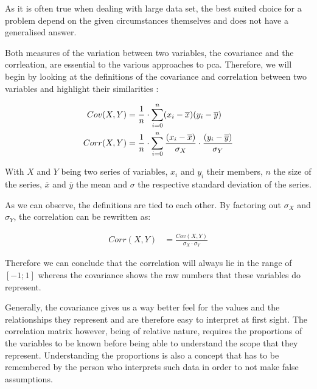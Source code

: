 As it is often true when dealing with large data set, the best suited choice for a problem depend on the given circumstances themselves and does not have a generalised answer. 

Both measures of the variation between two variables, the covariance and the corrleation, are essential to the various approaches to \gls{pca}.
Therefore, we will begin by looking at the definitions of the covariance and correlation between two variables and highlight their similarities \cite{downey2011think}:


\vspace{-28mm}
{
\begin{align}
	\label{formula:covariance}
	Cov(X,Y) &= \frac{1}{n} \cdot \displaystyle\sum_{i=0}^{n} (x_i - \overline{x})(y_i - \overline{y})\bigskip
	\\
	\label{formula:correlation}
	Corr(X,Y) &= \frac{1}{n} \cdot \displaystyle\sum_{i=0}^{n} \frac{(x_i - \overline{x})}{\sigma_X}\cdot\frac{(y_i - \overline{y})}{\sigma_Y}
\end{align}
}

\vspace{-10mm}
With $X$ and $Y$ being two series of variables, $x_i$ and $y_i$ their members, $n$ the size of the series, $\overline{x}$ and $\overline{y}$ the mean and $\sigma$ the respective standard deviation of the series.

As we can observe, the definitions are tied to each other. By factoring out $\sigma_X$ and $\sigma_Y$, the correlation can be rewritten as:

\vspace{-6mm}
\begin{align}
	\label{formula:covarianceFTcorrelation}
	Corr(X,Y) &= \frac{Cov(X,Y)}{\sigma_X \cdot \sigma_Y}
\end{align}

Therefore we can conclude that the correlation will always lie in the range of $[-1;1]$ whereas the covariance shows the raw numbers that these variables do represent.\bigskip


Generally, the covariance gives us a way better feel for the values and the relationships they represent and are therefore easy to interpret at first sight.
The correlation matrix however, being of relative nature, requires the proportions of the variables to be known before being able to understand the scope that they represent.
Understanding the proportions is also a concept that has to be remembered by the person who interprets such data in order to not make false assumptions.

